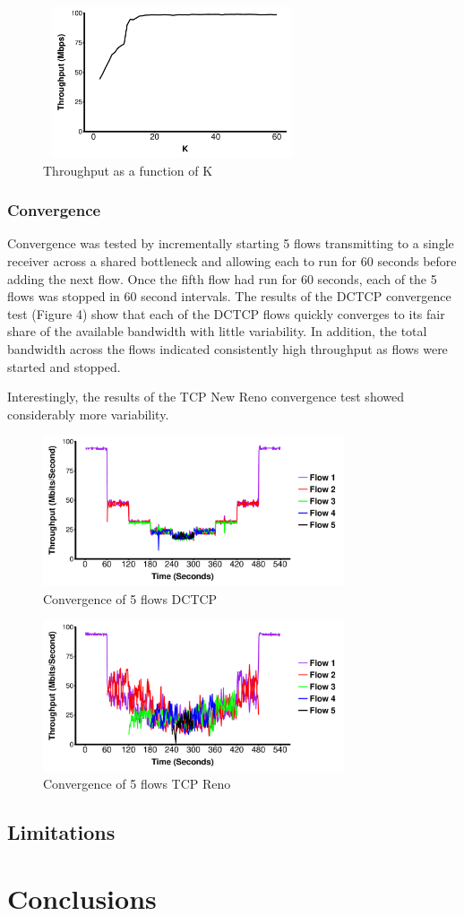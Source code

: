 \begin{figure}
\includegraphics[height=1.75in,width=3in]{k_throughput}
\caption{Throughput as a function of K}
\end{figure}

\subsubsection{Convergence}

Convergence was tested by incrementally starting 5 flows transmitting to a single receiver across a shared bottleneck and allowing each to run for 60 seconds before adding the next flow. Once the fifth flow had run for 60 seconds, each of the 5 flows was stopped in 60 second intervals. The results of the DCTCP convergence test (Figure 4) show that each of the DCTCP flows quickly converges to its fair share of the available bandwidth with little variability. In addition, the total bandwidth across the flows indicated consistently high throughput as flows were started and stopped.

Interestingly, the results of the TCP New Reno convergence test showed considerably more variability.  

\begin{figure}
\includegraphics[height=1.75in,width=3.5in]{dctcp_converg}
\caption{Convergence of 5 flows DCTCP}
\end{figure}

\begin{figure}
\includegraphics[height=1.75in,width=3.5in]{reno_converg}
\caption{Convergence of 5 flows TCP Reno}
\end{figure}

\subsection{Limitations}

\section{Conclusions}

